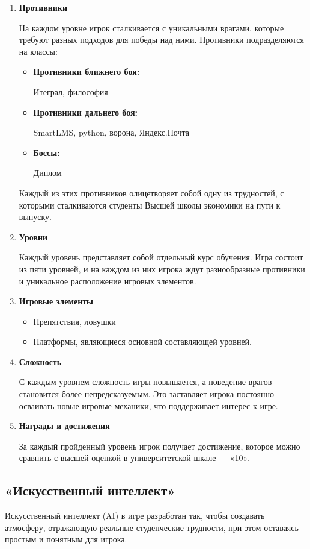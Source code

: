 \documentclass{article}
\begin{document}
    \begin{enumerate}
	\item \textbf{Противники} \par
	На каждом уровне игрок сталкивается с уникальными врагами, которые требуют разных подходов для победы над ними.
	Противники подразделяются на классы:
	\begin{itemize}
		\item \textbf{Противники ближнего боя:} \par
			Итеграл, философия
		\item \textbf{Противники дальнего боя:} \par
			SmartLMS, python, ворона, Яндекс.Почта
        \item \textbf{Боссы:} \par
            Диплом
	\end{itemize}
   Каждый из этих противников олицетворяет собой одну из трудностей, с которыми сталкиваются студенты Высшей школы экономики на пути к выпуску.
    \item \textbf{Уровни} \par
 Каждый уровень представляет собой отдельный курс обучения. Игра состоит из пяти уровней, и на каждом из них игрока ждут разнообразные противники и уникальное расположение игровых элементов.
    \item \textbf{Игровые элементы} \par
    \begin{itemize}
		\item Препятствия, ловушки
		\item Платформы, являющиеся основной составляющей уровней.
	\end{itemize}
    \item \textbf{Сложность} \par
    С каждым уровнем сложность игры повышается, а поведение врагов становится более непредсказуемым. Это заставляет игрока постоянно осваивать новые игровые механики, что поддерживает интерес к игре. 
    \item \textbf{Награды и достижения} \par
   За каждый пройденный уровень игрок получает достижение, которое можно сравнить с высшей оценкой в университетской шкале — «10».
   \end{enumerate}
\subsection{«Искусственный интеллект»}
    Искусственный интеллект (AI) в игре разработан так, чтобы создавать атмосферу, отражающую реальные студенческие трудности, при этом оставаясь простым и понятным для игрока.
\end{document}
